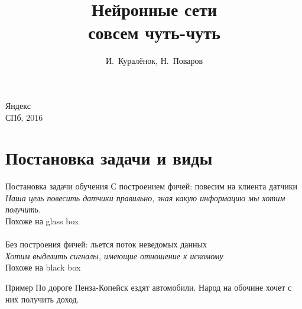 \documentclass[14pt, fleqn, xcolor={dvipsnames, table}]{beamer}
\title{Нейронные сети\\\small{совсем чуть-чуть}}
\author[]{\small{%
И.~Куралёнок,
Н.~Поваров}}
\date{}
\begin{document}
\begin{frame}
\maketitle
\small
\begin{center}
\vspace{-60pt}
\normalsize {\color{red}Я}ндекс \\
\vspace{80pt}
\footnotesize СПб, 2016
\end{center}
\end{frame}
\section{Постановка задачи и виды} %

\begin{frame}{Постановка задачи обучения}{}
{\color{blue}С построением фичей}: повесим на клиента датчики \\
\textit{Наша цель повесить датчики правильно, зная какую информацию мы хотим получить.}\\
Похоже на glass box\\
~\\
{\color{blue}Без построения фичей}: льется поток неведомых данных \\
\textit{Хотим выделить сигналы, имеющие отношение к искомому} \\
Похоже на black box
\end{frame}

\begin{frame}{Пример}
\small
По дороге Пенза-Копейск ездят автомобили. Народ на обочине хочет с них получить доход.\\
\footnotesize
{}
\end{frame}
\end{document}
